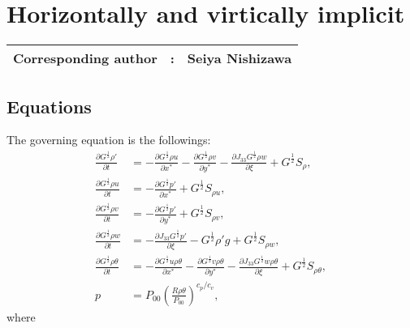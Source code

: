 \chapter{Horizontally and virtically implicit}
\label{chap:hivi}
{\bf \Large 
\begin{tabular}{ccc}
\hline
  Corresponding author & : & Seiya Nishizawa\\
\hline
\end{tabular}
}

\section{Equations}
The governing equation is the followings:
\begin{align}
  \frac{\partial G^{\frac{1}{2}}\rho'}{\partial t} &=
  -\frac{\partial G^{\frac{1}{2}}\rho u}{\partial x^*}
  -\frac{\partial G^{\frac{1}{2}}\rho v}{\partial y^*}
  -\frac{\partial J_{33}G^{\frac{1}{2}}\rho w}{\partial \xi}
  + G^{\frac{1}{2}}S_\rho, \\
  \frac{\partial G^{\frac{1}{2}}\rho u}{\partial t}
  &= -\frac{\partial G^{\frac{1}{2}}p'}{\partial x^*} + G^{\frac{1}{2}}S_{\rho u}, \\
  \frac{\partial G^{\frac{1}{2}}\rho v}{\partial t}
  &= -\frac{\partial G^{\frac{1}{2}}p'}{\partial y^*} + G^{\frac{1}{2}}S_{\rho v}, \\
  \frac{\partial G^{\frac{1}{2}}\rho w}{\partial t}
  &= -\frac{\partial J_{33}G^{\frac{1}{2}}p'}{\partial \xi} -G^{\frac{1}{2}}\rho' g + G^{\frac{1}{2}}S_{\rho w}, \\
  \frac{\partial G^{\frac{1}{2}}\rho\theta}{\partial t} &=
  -\frac{\partial G^{\frac{1}{2}}u \rho \theta}{\partial x^*}
  -\frac{\partial G^{\frac{1}{2}}v \rho \theta}{\partial y^*}
  -\frac{\partial J_{33}G^{\frac{1}{2}}w \rho \theta}{\partial \xi}
  + G^{\frac{1}{2}}S_{\rho\theta}, \\
  p &= P_{00}\left(\frac{R\rho\theta}{P_{00}}\right)^{c_p/c_v},
\end{align}
where

